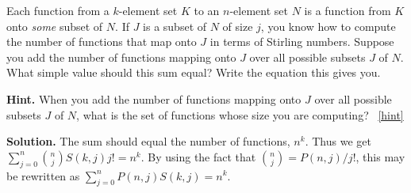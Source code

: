 \documentclass{book}
\begin{document}
\setcounter{project}{204}
\addtocounter{project}{-1}
\begin{activity}[]\label{Stirlingfalling}
\hypertarget{p-1142}{}%
Each function from a \(k\)-element set \(K\) to an \(n\)-element set \(N\) is a function from \(K\) onto \emph{some} subset of \(N\). If \(J\) is a subset of \(N\) of size \(j\), you know how to compute the number of functions that map onto \(J\) in terms of Stirling numbers. Suppose you add the number of functions mapping onto \(J\) over all possible subsets \(J\) of \(N\). What simple value should this sum equal? Write the equation this gives you.%
\par\smallskip%
\noindent\textbf{Hint.}\hypertarget{hint-129}{}\quad%
\hypertarget{p-1143}{}%
When you add the number of functions mapping onto \(J\) over all possible subsets \(J\) of \(N\), what is the set of functions whose size you are computing?%
~\hfill{\tiny\hyperlink{a-204}{[hint]}\hypertarget{q-204}{}}\par\smallskip%
\noindent\textbf{Solution.}\hypertarget{solution-113}{}\quad%
\hypertarget{p-1144}{}%
The sum should equal the number of functions, \(n^k\). Thus we get \(\sum_{j=0}^n \binom{n}{j}S(k,j)j! = n^k\). By using the fact that \(\binom{n}{j}= P(n,j)/j!\), this may be rewritten as \(\sum_{j=0}^n P(n,j)S(k,j) = n^k.\)%
\end{activity}
\end{document}
